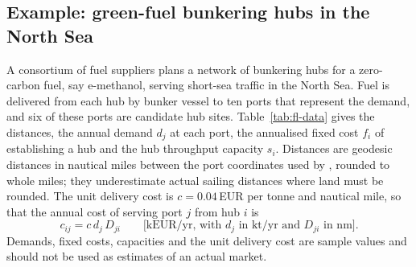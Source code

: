 \subsection{Example: green-fuel bunkering hubs in the North Sea}
\label{sec:fl-example}

A consortium of fuel suppliers plans a network of bunkering hubs for a zero-carbon fuel, say e-methanol, serving short-sea traffic in the North Sea. Fuel is delivered from each hub by bunker vessel to ten ports that represent the demand, and six of these ports are candidate hub sites. Table~\ref{tab:fl-data} gives the distances, the annual demand $d_j$ at each port, the annualised fixed cost $f_i$ of establishing a hub and the hub throughput capacity $s_i$. Distances are geodesic distances in nautical miles between the port coordinates used by \citet{Agersborg2025}, rounded to whole miles; they underestimate actual sailing distances where land must be rounded. The unit delivery cost is $c=0.04$\,EUR per tonne and nautical mile, so that the annual cost of serving port $j$ from hub $i$ is
\begin{equation}
  c_{ij} = c\, d_j\, D_{ji} \qquad \text{[kEUR/yr, with $d_j$ in kt/yr and $D_{ji}$ in nm]}.
  \label{eq:fl-cij}
\end{equation}
Demands, fixed costs, capacities and the unit delivery cost are sample values and should not be used as estimates of an actual market.

